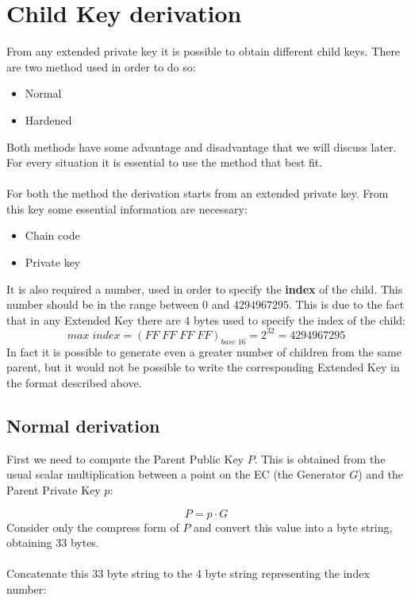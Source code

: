 \section{Child Key derivation}
From any extended private key it is possible to obtain different child keys. There are two method used in order to do so:
\begin{itemize}
	\item Normal
	\item Hardened
\end{itemize}
Both methods have some advantage and disadvantage that we will discuss later. For every situation it is essential to use the method that best fit.
\\ \\
For both the method the derivation starts from an extended private key. From this key some essential information are necessary:
\begin{itemize}[label=$\star$]
	\item Chain code
	\item Private key
\end{itemize}
It is also required a number, used in order to specify the \textbf{index} of the child. This number should be in the range between $0$ and $4294967295$. This is due to the fact that in any Extended Key there are 4 bytes used to specify the index of the child:
\begin{equation*}
max \; index=(FF\;FF\;FF\;FF)_{base \; 16} = 2^{32} = 4294967295
\end{equation*}
In fact it is possible to generate even a greater number of children from the same parent, but it would not be possible to write the corresponding Extended Key in the format described above.


\subsection{Normal derivation}

First we need to compute the Parent Public Key $P$. This is obtained from the usual scalar multiplication between a point on the EC (the Generator $G$) and the Parent Private Key $p$:

\begin{equation*}
P=p\cdot G
\end{equation*}
Consider only the compress form of $P$ and convert this value into a byte string, obtaining 33 bytes.
\\ \\
Concatenate this 33 byte string to the 4 byte string representing the index number:

